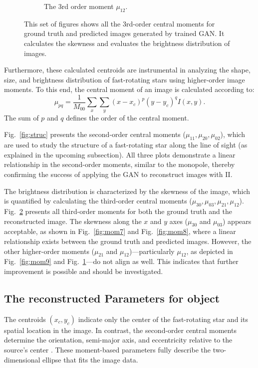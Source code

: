 \begin{figure}
\begin{subfigure}{0.50\linewidth}
		\caption{The 3rd order moment $\mu_{12}$.}
		\label{fig:mom10}
	\end{subfigure}\hfill
	\caption{This set of figures shows all the 3rd-order central moments for ground truth and predicted images generated by trained GAN. It calculates the skewness and evaluates the brightness distribution of images.}
	\label{fig:moments}
\end{figure}
Furthermore, these calculated centroids are instrumental in analyzing the shape, size, and brightness distribution of fast-rotating stars using higher-order image moments. To this end, the central moment of an image is calculated according to:
\begin{equation}
	\mu_{pq} = \frac{1}{M_{00}}\sum_{x} \sum_{y} (x - x_c)^p (y - y_c)^q I(x, y).
\end{equation}
The sum of \(p\) and \(q\) defines the order of the central moment. 

Fig.~\ref{fig:struc} presents the second-order central moments (\(\mu_{11}, \mu_{20}, \mu_{02}\)), which are used to study the structure of a fast-rotating star along the line of sight (as explained in the upcoming subsection). All three plots demonstrate a linear relationship in the second-order moments, similar to the monopole, thereby confirming the success of applying the GAN to reconstruct images with II.

The brightness distribution is characterized by the skewness of the image, which is quantified by calculating the third-order central moments (\(\mu_{30}, \mu_{03}, \mu_{21}, \mu_{12}\)). Fig.~\ref{fig:moments} presents all third-order moments for both the ground truth and the reconstructed image. The skewness along the $x$ and $y$ axes (\(\mu_{30}\) and \(\mu_{03}\)) appears acceptable, as shown in Fig.~\ref{fig:mom7} and Fig.~\ref{fig:mom8}, where a linear relationship exists between the ground truth and predicted images. However, the other higher-order moments (\(\mu_{21}\) and \(\mu_{12}\))—particularly \(\mu_{12}\), as depicted in Fig.~\ref{fig:mom9} and Fig.~\ref{fig:mom10}—do not align as well. This indicates that further improvement is possible and should be investigated.

\subsection{The reconstructed Parameters for object}
The centroids \((x_c, y_c)\) indicate only the center of the fast-rotating star and its spatial location in the image. In contrast, the second-order central moments determine the orientation, semi-major axis, and eccentricity relative to the source's center \citep{teague1980image}. These moment-based parameters fully describe the two-dimensional ellipse that fits the image data.

